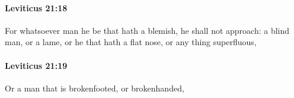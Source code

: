 		\paragraph{Leviticus 21:18} %
			\label{LEVITICUS-21-18}

			For whatsoever man he be that hath a blemish, he shall not approach: a blind man, or a lame, or he that hath a flat nose, or any thing superfluous,


		\paragraph{Leviticus 21:19} %
			\label{LEVITICUS-21-19}

			Or a man that is brokenfooted, or brokenhanded,


